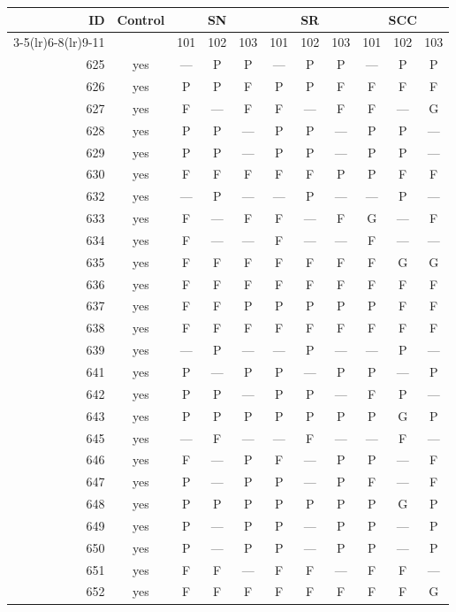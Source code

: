 \begin{table}[p]\centering\small
\begin{tabular*}{\textwidth}{@{\extracolsep{\fill}}rc*{9}{c}@{}}\toprule
ID & Control & \multicolumn{3}{c}{SN} & \multicolumn{3}{c}{SR} & \multicolumn{3}{c}{SCC}\\
\cmidrule(lr){3-5}\cmidrule(lr){6-8}\cmidrule(lr){9-11}
 & & 101 & 102 & 103 & 101 & 102 & 103 & 101 & 102 & 103\\\midrule
625 & yes & — & P & P & — & P & P & — & P & P\\
626 & yes & P & P & F & P & P & F & F & F & F\\
627 & yes & F & — & F & F & — & F & F & — & G\\
628 & yes & P & P & — & P & P & — & P & P & —\\
629 & yes & P & P & — & P & P & — & P & P & —\\
630 & yes & F & F & F & F & F & P & P & F & F\\
632 & yes & — & P & — & — & P & — & — & P & —\\
633 & yes & F & — & F & F & — & F & G & — & F\\
634 & yes & F & — & — & F & — & — & F & — & —\\
635 & yes & F & F & F & F & F & F & F & G & G\\
636 & yes & F & F & F & F & F & F & F & F & F\\
637 & yes & F & F & P & P & P & P & P & F & F\\
638 & yes & F & F & F & F & F & F & F & F & F\\
639 & yes & — & P & — & — & P & — & — & P & —\\
641 & yes & P & — & P & P & — & P & P & — & P\\
642 & yes & P & P & — & P & P & — & F & P & —\\
643 & yes & P & P & P & P & P & P & P & G & P\\
645 & yes & — & F & — & — & F & — & — & F & —\\
646 & yes & F & — & P & F & — & P & P & — & F\\
647 & yes & P & — & P & P & — & P & F & — & F\\
648 & yes & P & P & P & P & P & P & P & G & P\\
649 & yes & P & — & P & P & — & P & P & — & P\\
650 & yes & P & — & P & P & — & P & P & — & P\\
651 & yes & F & F & — & F & F & — & F & F & —\\
652 & yes & F & F & F & F & F & F & F & F & G\\

\end{tabular*}
\end{table}
